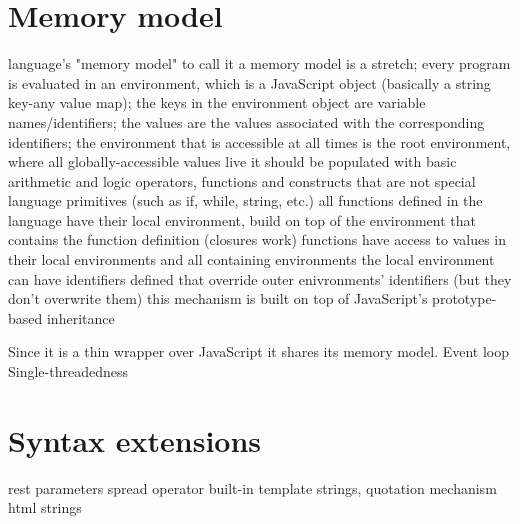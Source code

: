 \section{Memory model}

language's "memory model"
    to call it a memory model is a stretch;
    every program is evaluated in an environment, which is a JavaScript object (basically a string key-any value map);
    the keys in the environment object are variable names/identifiers;
    the values are the values associated with the corresponding identifiers;
    the environment that is accessible at all times is the root environment, where all globally-accessible values live
    it should be populated with basic arithmetic and logic operators, functions and constructs that are not special language primitives (such as if, while, string, etc.)
    all functions defined in the language have their local environment, build on top of the environment that contains the function definition (closures work)
    functions have access to values in their local environments and all containing environments
    the local environment can have identifiers defined that override outer enivronments' identifiers (but they don't overwrite them)
    this mechanism is built on top of JavaScript's prototype-based inheritance
    
Since it is a thin wrapper over JavaScript it shares its memory model.
Event loop
Single-threadedness


\section{Syntax extensions}
rest parameters
spread operator
built-in template strings, quotation mechanism
html strings 